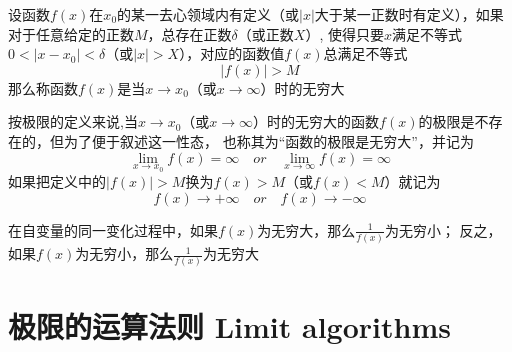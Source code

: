 \documentclass[UTF8]{ctexart}
\begin{document}
\bigskip

设函数$f(x)$在$x_0$的某一去心领域内有定义（或$|x|$大于某一正数时有定义），如果对于任意给定的正数$M$，总存在正数$\delta$（或正数$X$）,
使得只要$x$满足不等式$0<|x-x_0|<\delta$（或$|x|>X$），对应的函数值$f(x)$总满足不等式
\[
  |f(x)|>M
\]
那么称函数$f(x)$是当$x\to x_0$（或$x\to\infty$）时的无穷大

按极限的定义来说,当$x\to x_0$（或$x\to\infty$）时的无穷大的函数$f(x)$的极限是不存在的，但为了便于叙述这一性态，
也称其为“函数的极限是无穷大”，并记为
\[
  \lim_{x\to x_0}f(x)=\infty\quad or\quad \lim_{x\to\infty}f(x)=\infty
\]
如果把定义中的$|f(x)|>M$换为$f(x)>M$（或$f(x)<M$）就记为
\[
    f(x)\to+\infty\quad or\quad f(x)\to-\infty
\]

\bigskip

在自变量的同一变化过程中，如果$f(x)$为无穷大，那么$\frac{1}{f(x)}$为无穷小；
反之，如果$f(x)$为无穷小，那么$\frac{1}{f(x)}$为无穷大
\bigskip
\bigskip
\section*{极限的运算法则 Limit algorithms}

\bigskip
\end{document}
